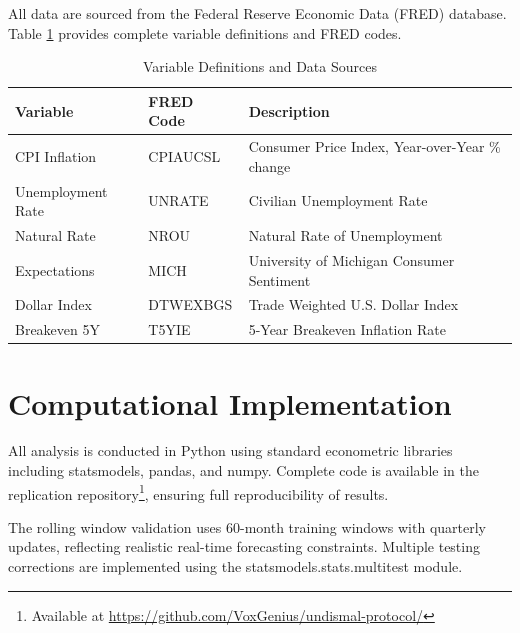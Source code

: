 \documentclass[12pt]{article}
\begin{document}
All data are sourced from the Federal Reserve Economic Data (FRED) database. Table \ref{tab:variables} provides complete variable definitions and FRED codes.

\begin{table}[H]
\centering
\caption{Variable Definitions and Data Sources}
\label{tab:variables}
\begin{tabular}{lll}
\toprule
Variable & FRED Code & Description \\
\midrule
CPI Inflation & CPIAUCSL & Consumer Price Index, Year-over-Year \% change \\
Unemployment Rate & UNRATE & Civilian Unemployment Rate \\
Natural Rate & NROU & Natural Rate of Unemployment \\
Expectations & MICH & University of Michigan Consumer Sentiment \\
Dollar Index & DTWEXBGS & Trade Weighted U.S. Dollar Index \\
Breakeven 5Y & T5YIE & 5-Year Breakeven Inflation Rate \\
\bottomrule
\end{tabular}
\end{table}

\section{Computational Implementation}

All analysis is conducted in Python using standard econometric libraries including statsmodels, pandas, and numpy. Complete code is available in the replication repository\footnote{Available at \url{https://github.com/VoxGenius/undismal-protocol/}}, ensuring full reproducibility of results.

The rolling window validation uses 60-month training windows with quarterly updates, reflecting realistic real-time forecasting constraints. Multiple testing corrections are implemented using the statsmodels.stats.multitest module.
\end{document}
